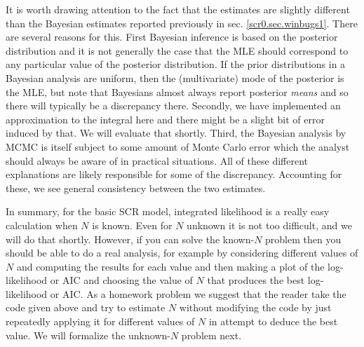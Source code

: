 It is worth drawing attention to the fact that the estimates are slightly
different than the Bayesian estimates reported previously in
sec. \ref{scr0.sec.winbugs1}.   There are several reasons
for this.  First Bayesian inference is based on the posterior
distribution and it is not generally the case that the MLE should
correspond to any particular value of the posterior distribution. If
the prior distributions in a Bayesian analysis are uniform, then the
(multivariate) mode of the posterior is the MLE, but note that
Bayesians almost always report posterior {\it means} and so there will
typically be a discrepancy there. Secondly, we have implemented an
approximation to the integral here and there might be a slight bit of
error induced by that. We will evaluate that shortly. Third, the
Bayesian analysis by MCMC is itself subject to some amount of Monte Carlo
error which the analyst should always be aware of in practical
situations.  All of these different explanations are likely
responsible for some of the discrepancy. Accounting for these, we see
general consistency between the two estimates.

\begin{comment} 
To compute the integrated likelihood we used a discrete representation
of the state-space so that the integral could be approximated as a
summation over possible values of ${\bf s}$ with each value being
weighted by its probability of occurring, which is $1/nG$ under the
assumption that ${\bf s}$ is uniform on the state-space ${\cal
  S}$. Recall
in Chapt. \ref{chapt.scr0} we 
used a discrete state-space in developing a Bayesian analysis of the
model in order to be able to modify the state-space in a flexible
manner. In that case, we could use the discretized state-space as the
integration grid and just feed it into our integrated likelihood
routine. 
\end{comment}

In summary, for the basic SCR model, integrated
likelihood is a really easy calculation when $N$ is known. Even for $N$
unknown it is not too difficult, and we will do that shortly.
However, if you can solve the known-$N$ problem then you should be able
to do a real analysis, for example by considering different values of
$N$ and computing the results for each value and then making a plot of
the log-likelihood or AIC and choosing the value of $N$ that produces
the best log-likelihood or AIC. As a homework problem we suggest that
the reader take the code given above and try to estimate $N$ without
modifying the code by just repeatedly applying it for 
different values of $N$ in attempt to deduce the best value.
We will formalize the unknown-$N$ problem next.


